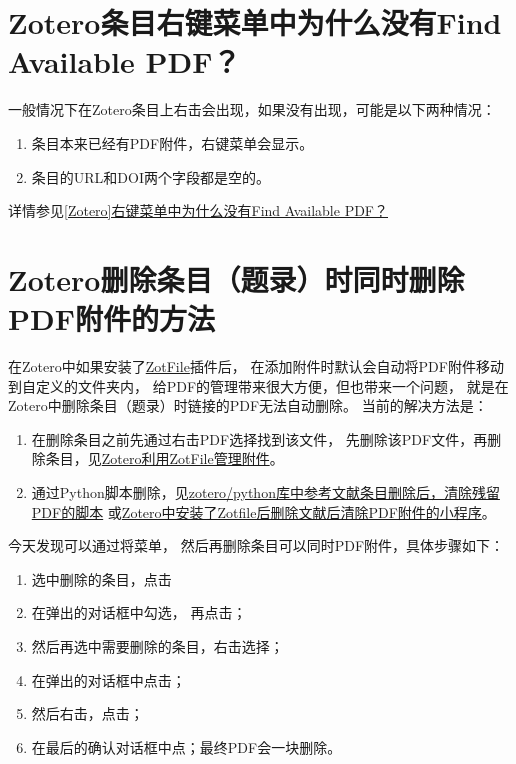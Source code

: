 \documentclass[cn,11pt,chinese]{elegantbook}
\begin{document}
\begin{enumerate}
			\end{enumerate}
		
	\section{Zotero条目右键菜单中为什么没有Find Available PDF？}\label{sec:Find_PDF}	
				一般情况下在Zotero条目上右击会出现，如果没有出现，可能是以下两种情况：
				\begin{enumerate}
					\item 条目本来已经有PDF附件，右键菜单会显示。
					\item 条目的URL和DOI两个字段都是空的。
				\end{enumerate}
				详情参见\href{https://zhuanlan.zhihu.com/p/348697024}
							{[Zotero]右键菜单中为什么没有Find Available PDF？}
	
	\section{Zotero删除条目（题录）时同时删除PDF附件的方法}\label{sec:Delete_attach}						
			在Zotero中如果安装了\href{http://zotfile.com/}{ZotFile}插件后，
			在添加附件时默认会自动将PDF附件移动到自定义的文件夹内，
			给PDF的管理带来很大方便，但也带来一个问题，
			就是在Zotero中删除条目（题录）时链接的PDF无法自动删除。
			当前的解决方法是：
			\begin{enumerate}
				\item 在删除条目之前先通过右击PDF选择找到该文件，
				先删除该PDF文件，再删除条目，见\href{https://zhuanlan.zhihu.com/p/337801423}
			{Zotero利用ZotFile管理附件}。
				\item 通过Python脚本删除，见\href{https://zhuanlan.zhihu.com/p/121770068}
				{zotero/python库中参考文献条目删除后，清除残留PDF的脚本}
				或\href{https://zhuanlan.zhihu.com/p/109531298}
				{Zotero中安装了Zotfile后删除文献后清除PDF附件的小程序}。
			\end{enumerate}
			
			今天发现可以通过将菜单，
			然后再删除条目可以同时PDF附件，具体步骤如下：
			\begin{enumerate}
				\item 选中删除的条目，点击
				\item 在弹出的对话框中勾选，
					再点击；
				\item 然后再选中需要删除的条目，右击选择；
				\item 在弹出的对话框中点击；
				\item 然后右击，点击；
				\item 在最后的确认对话框中点；最终PDF会一块删除。
				\end{enumerate}
			 
\end{document}
